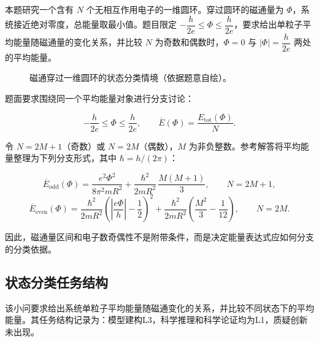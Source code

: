 \documentclass[
  12pt,
  a4paper]{ctexbook}
\begin{document}
本题研究一个含有 \(N\) 个无相互作用电子的一维圆环。穿过圆环的磁通量为
\(\Phi\)，系统接近绝对零度，总能量取最小值。题目限定
\(-\dfrac{h}{2e}\leq\Phi\leq\dfrac{h}{2e}\)，要求给出单粒子平均能量随磁通量的变化关系，并比较
\(N\) 为奇数和偶数时，\(\Phi=0\) 与 \(|\Phi|=\dfrac{h}{2e}\)
两处的平均能量。

\begin{figure}[H]
\centering
{}
\caption{磁通穿过一维圆环的状态分类情境（依据题意自绘）。}
\end{figure}

题面要求围绕同一个平均能量对象进行分支讨论：

\[
-\frac{h}{2e}\leq \Phi\leq\frac{h}{2e},
\qquad
\overline{E}(\Phi)=\frac{E_{\mathrm{tot}}(\Phi)}{N}.
\]

令 \(N=2M+1\)（奇数）或 \(N=2M\)（偶数），\(M\)
为非负整数。参考解答将平均能量整理为下列分支形式，其中
\(\hbar=h/(2\pi)\)：

\[
\overline{E}_{\mathrm{odd}}(\Phi)
=\frac{e^2\Phi^2}{8\pi^2mR^2}
+\frac{\hbar^2}{2mR^2}\,\frac{M(M+1)}{3},
\qquad N=2M+1,
\]
\[
\overline{E}_{\mathrm{even}}(\Phi)
=\frac{\hbar^2}{2mR^2}
 \left(\left|\frac{e\Phi}{h}\right|-\frac12\right)^2
+\frac{\hbar^2}{2mR^2}
 \left(\frac{M^2}{3}-\frac1{12}\right),
\qquad N=2M.
\]

因此，磁通量区间和电子数奇偶性不是附带条件，而是决定能量表达式应如何分支的分类依据。

\subsection{状态分类任务结构}\label{ux72b6ux6001ux5206ux7c7bux4efbux52a1ux7ed3ux6784}

该小问要求给出系统单粒子平均能量随磁通变化的关系，并比较不同状态下的平均能量。其任务结构记录为：模型建构L3，科学推理和科学论证均为L1，质疑创新未出现。
\end{document}
